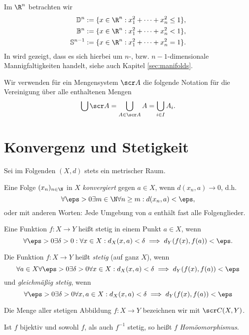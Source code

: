 \begin{conv}
	Im $\R^n$ betrachten wir
	\begin{align*}
		\D^n := \{ x \in \R^n : x_1^2 + \dotsb + x_n^2 \le 1 \}, \\
		\B^n := \{ x \in \R^n : x_1^2 + \dotsb + x_n^2 < 1 \}, \\
		\S^{n-1} := \{ x \in \R^n : x_1^2 + \dotsb + x_n^2 = 1 \}.
	\end{align*}
	In  wird gezeigt, dass es sich hierbei um $n$-, bzw. $n-1$-dimensionale Mannigfaltigkeiten handelt, siehe auch Kapitel \ref{sec:manifolds}.
\end{conv}


\begin{nt}
	Wir verwenden für ein Mengensystem $\scr A$ die folgende Notation für die Vereinigung über alle enthaltenen Mengen
	\[
		\bigcup \scr A
		= \bigcup_{A \in \scr A} A
		= \bigcup_{i\in I} A_i.
	\]
\end{nt}


\section{Konvergenz und Stetigkeit}

Sei im Folgenden $(X,d)$ stets ein metrischer Raum.

\begin{df}
	Eine Folge $(x_n)_{n\in \N}$ in $X$ \emph{konvergiert} gegen $a \in X$, wenn $d(x_n, a) \to 0$, d.h.
	\[
		\forall \eps > 0 \exists m \in \N \forall n \ge m : d(x_n, a) < \eps,
	\]
	oder mit anderen Worten: Jede Umgebung von $a$ enthält fast alle Folgenglieder.
\end{df}

\begin{df} \label{df:metric_space_homeomorphism}
	Eine Funktion $f: X \to Y$ heißt stetig in einem Punkt $a \in X$, wenn
	\[
		\forall \eps > 0 \exists \delta > 0 : \forall x \in X : d_X(x,a) < \delta \implies d_Y(f(x), f(a)) < \eps.
	\]

	Die Funktion $f: X \to Y$ heißt \emph{stetig} (auf ganz $X$), wenn
	\[
		\forall a \in X \forall \eps > 0 \exists \delta > 0 \forall x \in X: d_X(x,a) < \delta \implies d_Y(f(x), f(a)) < \eps
	\]
	und \emph{gleichmäßig stetig}, wenn
	\[
		\forall \eps > 0 \exists \delta > 0 \forall x,a \in X: d_X(x,a) < \delta \implies d_Y(f(x), f(a)) < \eps
	\]

	Die Menge aller stetigen Abbildung $f: X \to Y$ bezeichnen wir mit $\scr C(X,Y)$.

	Ist $f$ bijektiv und sowohl $f$, als auch $f^{-1}$ stetig, so heißt $f$ \emph{Homöomorphismus}.
\end{df}

